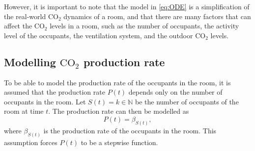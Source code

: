 However, it is important to note that the model in \cref{eq:ODE} is a
simplification of the real-world $\text{CO}_2$ dynamics of a room, and that 
there are many factors that can affect the $\text{CO}_2$ levels in a room, 
such as the number of occupants, the activity level of the occupants, 
the ventilation system, and the outdoor $\text{CO}_2$ levels. \\

\subsection{Modelling $\text{CO}_2$ production rate}

To be able to model the production rate of the occupants in the room, 
it is assumed that the production rate $P(t)$ depends only on the number of occupants in the room.
Let $S(t) = k \in \mathbb{N}$ be the number of occupants of the room
at time $t$. The production rate can then be modelled as
\begin{equation}
    P(t) = \beta_{S(t)},
\end{equation}
where $\beta_{S(t)}$ is the production rate of the occupants in the room. 
This assumption forces $P(t)$ to be a stepwise function. 
\bigskip



